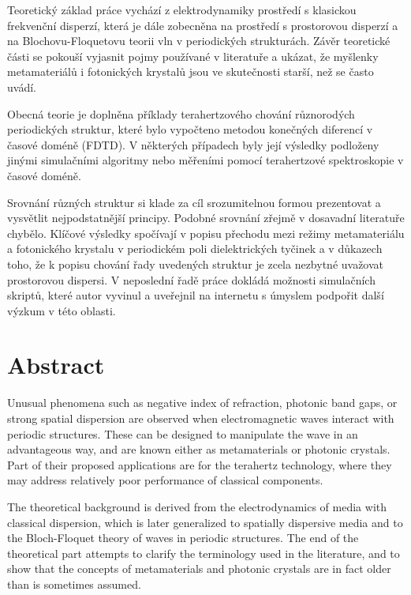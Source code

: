 Teoretický základ práce vychází z elektrodynamiky prostředí s klasickou frekvenční disperzí, která je dále zobecněna na prostředí s prostorovou disperzí a na Blochovu-Floquetovu teorii vln v periodických strukturách. Závěr teoretické části se pokouší vyjasnit pojmy používané v literatuře a ukázat, že myšlenky metamateriálů i fotonických krystalů jsou ve skutečnosti starší, než se často uvádí.

Obecná teorie je doplněna příklady terahertzového chování různorodých periodických struktur, které bylo vypočteno metodou konečných diferencí v časové doméně (FDTD). V některých případech byly její výsledky podloženy jinými simulačními algoritmy nebo měřeními pomocí terahertzové spektroskopie v časové doméně.

Srovnání  různých struktur si klade za cíl srozumitelnou formou prezentovat a vysvětlit nejpodstatnější principy. Podobné srovnání zřejmě v dosavadní literatuře chybělo. Klíčové výsledky spočívají v popisu přechodu mezi režimy metamateriálu a fotonického krystalu v periodickém poli dielektrických tyčinek a v důkazech toho, že k popisu chování řady uvedených struktur je zcela nezbytné uvažovat prostorovou dispersi. V neposlední řadě práce dokládá možnosti simulačních skriptů, které autor vyvinul a uveřejnil na internetu s úmyslem podpořit další výzkum v této oblasti. 

\vspace{0mm}
{\let\clearpage\relax\chapter*{Abstract}}
\noindent
Unusual phenomena such as negative index of refraction, photonic band gaps, or strong spatial dispersion are observed when electromagnetic waves interact with periodic structures. These can be designed to manipulate the wave in an advantageous way, and are known either as metamaterials or photonic crystals. Part of their proposed applications are for the terahertz technology, where they may address relatively poor performance of classical components.

The theoretical background is derived from the electrodynamics of media with classical dispersion, which is later generalized to spatially dispersive media and to the Bloch-Floquet theory of waves in periodic structures. The end of the theoretical part attempts to clarify the terminology used in the literature, and to show that the concepts of metamaterials and photonic crystals are in fact older than is sometimes assumed.

